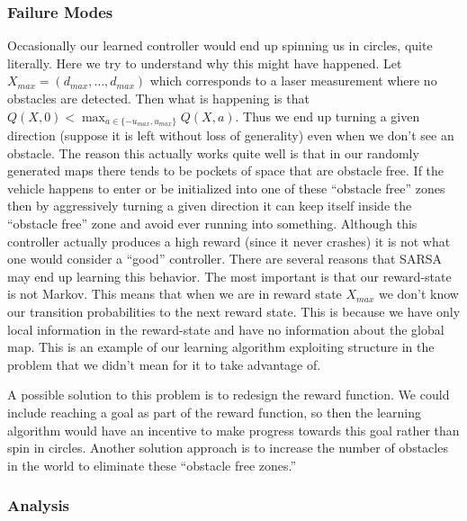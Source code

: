\documentclass{article}
\begin{document}
\subsubsection{Failure Modes}
\label{failure_modes}

Occasionally our learned controller would end up spinning us in circles, quite literally. Here we try to understand why this might have happened. 
Let $X_{max} = (d_{max}, \ldots, d_{max})$ which corresponds to a laser measurement where no obstacles are detected. Then what is happening is that $Q(X,0) < \max_{a \in \{-u_{max},u_{max}\}} Q(X,a)$. Thus we end up turning a given direction (suppose it is left without loss of generality) even when we don't see an obstacle. The reason this actually works quite well is that in our randomly generated maps there tends to be pockets of space that are obstacle free. If the vehicle happens to enter or be initialized into one of these ``obstacle free'' zones then by aggressively turning a given direction it can keep itself inside the ``obstacle free'' zone and avoid ever running into something. Although this controller actually produces a high reward (since it never crashes) it is not what one would consider a ``good'' controller. There are several reasons that SARSA may end up learning this behavior. The most important is that our reward-state is not Markov. This means that when we are in reward state $X_{max}$ we don't know our transition probabilities to the next reward state. This is because we have only local information in the reward-state and have no information about the global map. This is an example of our learning algorithm exploiting structure in the problem that we didn't mean for it to take advantage of.

A possible solution to this problem is to redesign the reward function. We could include reaching a goal as part of the reward function, so then the learning algorithm would have an incentive to make progress towards this goal rather than spin in circles. Another solution approach is to increase the number of obstacles in the world to eliminate these ``obstacle free zones.''


\subsubsection{Analysis}
\label{sarsa_analysis}
\end{document}
